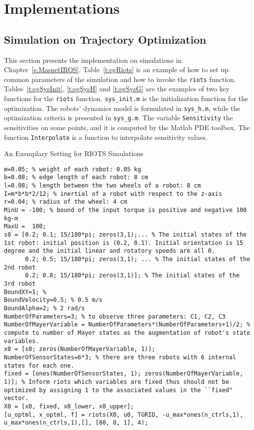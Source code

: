 \chapter{Implementations}
\section{Simulation on Trajectory Optimization}
This section presents the implementation on simulations in Chapter~\ref{s:MasnetIROS}. Table~\ref{t:egRiots} is an example of how to set up common parameters of the simulation and how to invoke the \texttt{riots} function.  Tables~\ref{t:egSysInit}, \ref{t:egSysH} and \ref{t:egSysG} are the examples of two key functions for the \texttt{riots} function. \verb!sys_init.m! is the initialization function for the optimization. The robots' dynamics model is formulated in \verb!sys_h.m!, while the optimization criteria is presented in \verb!sys_g.m!. The variable \verb!Sensitivity! the sensitivities on some points, and it is  computed by the Matlab PDE toolbox. The function \verb!Interpolate! is a function to interpolate sensitivity values.

\lstset{language=Matlab, breaklines=true, numbers=left, texcl, mathescape=true }


\begin{table}[!h]
  \centering
  \caption{An Exemplary Setting for RIOTS Simulations}\label{t:egRiots}
\begin{lstlisting}
m=0.05; % weight of each robot: 0.05 kg
b=0.08; % edge length of each robot: 8 cm
l=0.08; % length between the two wheels of a robot: 8 cm
I=m*b*b*2/12; % inertial of a robot with respect to the z-axis
r=0.04; % radius of the wheel: 4 cm
MinU = -100; % bound of the input torque is positive and negative 100 kg-m
MaxU =  100;
s0 = [0.2; 0.1; 15/180*pi; zeros(3,1);... % The initial states of the 1st robot: initial position is (0.2, 0.1). Initial orientation is 15 degree and the initial linear and rotatory speeds are all 0.
      0.2; 0.5; 15/180*pi; zeros(3,1); ... % The initial states of the 2nd robot
      0.2; 0.8; 15/180*pi; zeros(3,1)]; % The initial states of the 3rd robot
BoundXY=1; %
BoundVelocity=0.5; % 0.5 m/s
BoundAlpha=2; % 2 rad/s
NumberOfParameters=3; % to observe three parameters: C1, C2, C3
NumberOfMayerVariable = NumberOfParameters*(NumberOfParameters+1)/2; % compute to number of Mayer states as the augmentation of robot's state variables.
x0 = [s0; zeros(NumberOfMayerVariable, 1)];
NumberOfSensorStates=6*3; % there are three robots with 6 internal states for each one.
fixed = [ones(NumberOfSensorStates, 1); zeros(NumberOfMayerVariable, 1)]; % Inform riots which variables are fixed thus should not be optimized by assigning 1 to the associated values in the ``fixed" vector.
X0 = [x0, fixed, x0_lower, x0_upper];
[u_optml, x_optml, f] = riots(X0, u0, TGRID, -u_max*ones(n_ctrls,1), u_max*ones(n_ctrls,1),[], [80, 0, 1], 4);
\end{lstlisting}
\end{table}


